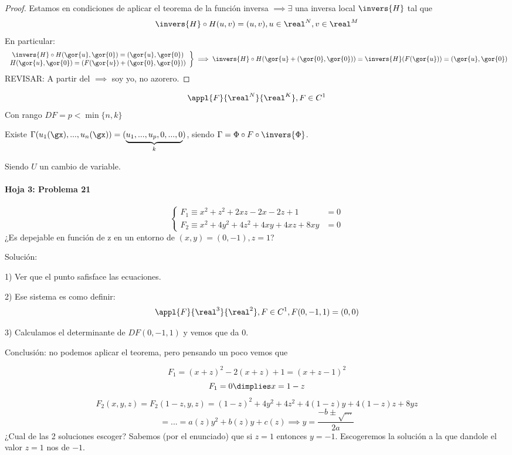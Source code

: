 \begin{proof}
Estamos en condiciones de aplicar el teorema de la función inversa $ \implies \exists$ una inversa local $\invers{H}$ tal que
\[\invers{H} \circ H(u,v) = (u,v), u\in \real^N,v\in\real^M\]
En particular:
\[\left. \begin{array}{c} \invers{H} \circ H (\gor{u},\gor{0}) = (\gor{u},\gor{0})\\
H(\gor{u},\gor{0}) = (F(\gor{u}) + (\gor{0}, \gor{0})) \end{array} \right\} \implies \invers{H} \circ H(\gor{u}+(\gor{0},\gor{0})) = \invers{H}(F(\gor{u})) = (\gor{u},\gor{0})\]
REVISAR: A partir del $\implies$ soy yo, no azorero.
\end{proof}

\begin{theorem}
\[\appl{F}{\real^N}{\real^K}, F\in C^1\]
Con rango $DF = p < \min\{n,k\}$

Existe $\Gamma (u_1(\gx),...,u_n(\gx)) = (\underbrace{u_1,...,u_p,0,...,0}_{k})$, siendo $\Gamma = \Phi \circ F \circ \invers{\Phi}$.
 
 
 Siendo $U$ un cambio de variable.
\end{theorem}

\paragraph{Hoja 3: Problema 21}

\[\left\{\begin{array}{cc}
   F_1\equiv x^2+z^2+2xz-2x-2z+1&=0\\
   F_2\equiv x^2+4y^2+4z^2+4xy+4xz+8xy&=0
  \end{array}\right.\]
  ¿Es depejable en función de z en un entorno de $(x,y) = (0,-1), z=1$?
  
Solución:

1) Ver que el punto safisface las ecuaciones.

2) Ese sistema es como definir:
\[\appl{F}{\real^3}{\real^2}, F\in C^1, F(0,-1,1) = (0,0)\]

3) Calculamos el determinante de $DF(0,-1,1)$ y vemos que da $0$. 

Conclusión: no podemos aplicar el teorema, pero pensando un poco vemos que 

\[F_1 = (x+z)^2 -2(x+z) + 1 = (x+z-1)^2\]
\[F_1 = 0 \dimplies x=1-z\]
\[F_2(x,y,z) = F_2(1-z,y,z) = (1-z)^2 + 4y^2 + 4z^2 + 4(1-z)y + 4(1-z)z+8yz\]
\[ =... = a(z)y^2+b(z)y+c(z) \implies y=\frac{-b\pm \sqrt{...}}{2a}\]
¿Cual de las 2 soluciones escoger? Sabemos (por el enunciado) que si $z=1$ entonces $y=-1$. Escogeremos la solución a la que dandole el valor $z=1$ nos de $-1$.

